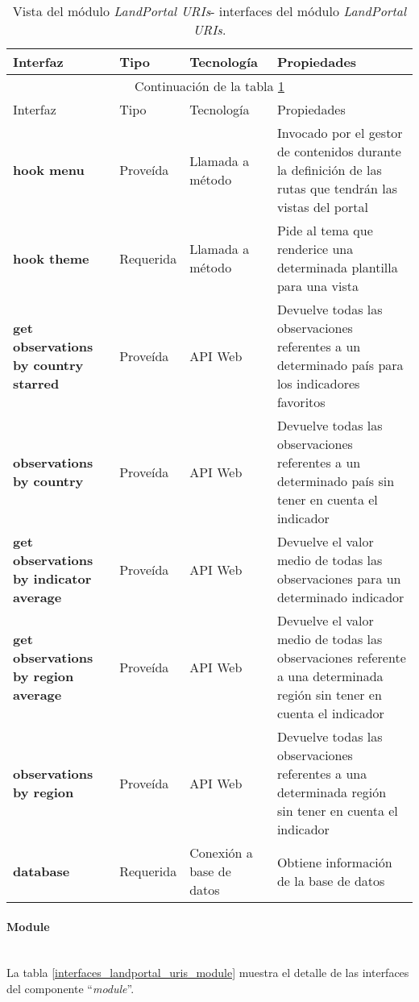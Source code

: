 \begin{longtable}[c]{|p{25mm}|p{20mm}|p{30mm}|p{60mm}|}
	\caption{Vista del módulo \textit{LandPortal URIs}- interfaces del módulo \textit{LandPortal URIs}. \label{interfaces_landportal_uris_landportal_uris}}\\
		\hline
			Interfaz & Tipo & Tecnología & Propiedades\\
		\hline
		\hline
	\endfirsthead
		\hline
		\multicolumn{4}{|c|}{Continuación de la tabla \ref{interfaces_landportal_uris_landportal_uris}}\\
		\hline
			Interfaz & Tipo & Tecnología & Propiedades\\
		\hline
		\hline
	\endhead
	\hline
	\endfoot
		\textbf{hook menu} & Proveída & Llamada a método & Invocado por el gestor de contenidos durante la definición de las rutas que tendrán las vistas del portal \\
		\hline
		\textbf{hook theme} & Requerida & Llamada a método & Pide al tema que renderice una determinada plantilla para una vista \\
		\hline
		\textbf{get observations by country starred} & Proveída & API Web & Devuelve todas las observaciones referentes a un determinado país para los indicadores favoritos \\
		\hline
		\textbf{observations by country} & Proveída & API Web & Devuelve todas las observaciones referentes a un determinado país sin tener en cuenta el indicador \\
		\hline
		\textbf{get observations by indicator average} & Proveída & API Web & Devuelve el valor medio de todas las observaciones para un determinado indicador \\
		\hline
		\textbf{get observations by region average} & Proveída & API Web & Devuelve el valor medio de todas las observaciones referente a una determinada región sin tener en cuenta el indicador \\
		\hline
		\textbf{observations by region} & Proveída & API Web & Devuelve todas las observaciones referentes a una determinada región sin tener en cuenta el indicador \\
		\hline
		\textbf{database} & Requerida & Conexión a base de datos & Obtiene información de la base de datos \\
	\hline
	\hline
\end{longtable}

\paragraph{Module} \hfill \\
La tabla \ref{interfaces_landportal_uris_module} muestra el detalle de las interfaces del componente ``\textit{module}''.  

